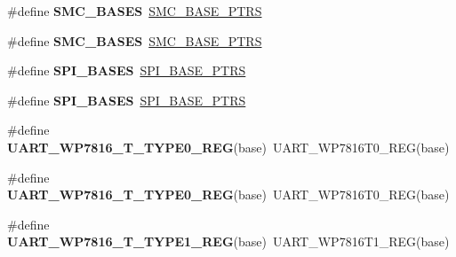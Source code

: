 \begin{DoxyCompactItemize}
\item 
\#define {\bfseries S\+M\+C\+\_\+\+B\+A\+S\+ES}~\hyperlink{group__SMC__Peripheral__Access__Layer_gae583f3f0917ee513adcac36dd042a5f3}{S\+M\+C\+\_\+\+B\+A\+S\+E\+\_\+\+P\+T\+RS}\hypertarget{group__Backward__Compatibility__Symbols_ga3c3dac14aea70e071c763a0fd836963b}{}\label{group__Backward__Compatibility__Symbols_ga3c3dac14aea70e071c763a0fd836963b}

\item 
\#define {\bfseries S\+M\+C\+\_\+\+B\+A\+S\+ES}~\hyperlink{group__SMC__Peripheral__Access__Layer_gae583f3f0917ee513adcac36dd042a5f3}{S\+M\+C\+\_\+\+B\+A\+S\+E\+\_\+\+P\+T\+RS}\hypertarget{group__Backward__Compatibility__Symbols_ga3c3dac14aea70e071c763a0fd836963b}{}\label{group__Backward__Compatibility__Symbols_ga3c3dac14aea70e071c763a0fd836963b}

\item 
\#define {\bfseries S\+P\+I\+\_\+\+B\+A\+S\+ES}~\hyperlink{group__SPI__Peripheral__Access__Layer_ga3a16fecfe27c2052ab60e014be3f66f6}{S\+P\+I\+\_\+\+B\+A\+S\+E\+\_\+\+P\+T\+RS}\hypertarget{group__Backward__Compatibility__Symbols_ga10a4758c2218025a1cafc4ab139d074a}{}\label{group__Backward__Compatibility__Symbols_ga10a4758c2218025a1cafc4ab139d074a}

\item 
\#define {\bfseries S\+P\+I\+\_\+\+B\+A\+S\+ES}~\hyperlink{group__SPI__Peripheral__Access__Layer_ga3a16fecfe27c2052ab60e014be3f66f6}{S\+P\+I\+\_\+\+B\+A\+S\+E\+\_\+\+P\+T\+RS}\hypertarget{group__Backward__Compatibility__Symbols_ga10a4758c2218025a1cafc4ab139d074a}{}\label{group__Backward__Compatibility__Symbols_ga10a4758c2218025a1cafc4ab139d074a}

\item 
\#define {\bfseries U\+A\+R\+T\+\_\+\+W\+P7816\+\_\+\+T\+\_\+\+T\+Y\+P\+E0\+\_\+\+R\+EG}(base)~U\+A\+R\+T\+\_\+\+W\+P7816\+T0\+\_\+\+R\+EG(base)\hypertarget{group__Backward__Compatibility__Symbols_gadbc29832ac629b24c0cd4b7e3503d12b}{}\label{group__Backward__Compatibility__Symbols_gadbc29832ac629b24c0cd4b7e3503d12b}

\item 
\#define {\bfseries U\+A\+R\+T\+\_\+\+W\+P7816\+\_\+\+T\+\_\+\+T\+Y\+P\+E0\+\_\+\+R\+EG}(base)~U\+A\+R\+T\+\_\+\+W\+P7816\+T0\+\_\+\+R\+EG(base)\hypertarget{group__Backward__Compatibility__Symbols_gadbc29832ac629b24c0cd4b7e3503d12b}{}\label{group__Backward__Compatibility__Symbols_gadbc29832ac629b24c0cd4b7e3503d12b}

\item 
\#define {\bfseries U\+A\+R\+T\+\_\+\+W\+P7816\+\_\+\+T\+\_\+\+T\+Y\+P\+E1\+\_\+\+R\+EG}(base)~U\+A\+R\+T\+\_\+\+W\+P7816\+T1\+\_\+\+R\+EG(base)\hypertarget{group__Backward__Compatibility__Symbols_ga5b2fc81c8b3403186dcbdd324f517246}{}\label{group__Backward__Compatibility__Symbols_ga5b2fc81c8b3403186dcbdd324f517246}


\end{DoxyCompactItemize}

